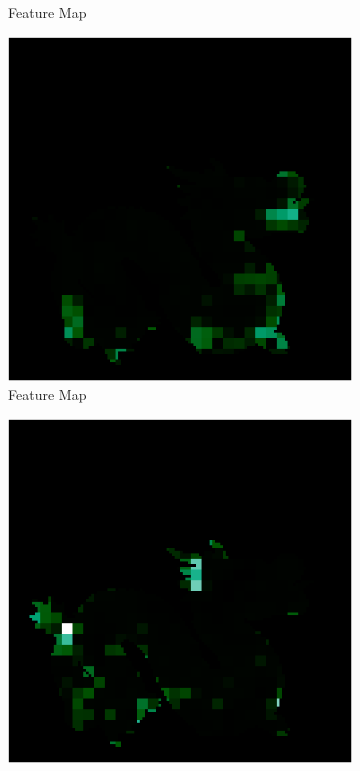 \begin{figure}[H]
\begin{subfigure}[b]{0.19\linewidth}
		\caption{Feature Map}
	\end{subfigure}
	\begin{subfigure}[b]{0.19\linewidth}
		\includegraphics[width=\linewidth]{./Figures/feature_map_gcnn/feature_map_gcnn-cnn_11.png}
		\caption{Feature Map}
	\end{subfigure}
	\begin{subfigure}[b]{0.19\linewidth}
		\includegraphics[width=\linewidth]{./Figures/feature_map_gcnn/feature_map_gcnn-cnn_4.png}

\end{subfigure}
\end{figure}
